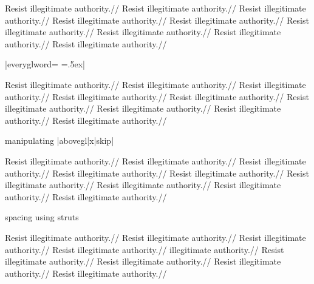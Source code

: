 \leavevmode
\begingl[glstyle=wrap,everygla=\ninerm,everyglb=\tenrm,
   everyglc=\elevenrm,everygld=\twelverm,everygle=\twelvebf,everyglf=\ninerm,
   everyglword=\offinterlineskip]
\gla Resist illegitimate authority.//
\glb Resist illegitimate authority.//
\glc Resist illegitimate authority.//
\gld Resist illegitimate authority.//
\gle Resist illegitimate authority.//
\gld Resist illegitimate authority.//
\glc Resist illegitimate authority.//
\glb Resist illegitimate authority.//
\glf Resist illegitimate authority.//
\endgl
\xe

\ex |everyglword={\baselineskip=0pt
\lineskip=.5ex}|
\smallskip

\leavevmode
\begingl[glstyle=wrap,everygla=\ninerm,everyglb=\tenrm,
   everyglc=\elevenrm,everygld=\twelverm,everygle=\twelvebf,everyglf=\ninerm,
   everyglword={\baselineskip=0pt \lineskip=.5ex}]
\gla Resist illegitimate authority.//
\glb Resist illegitimate authority.//
\glc Resist illegitimate authority.//
\gld Resist illegitimate authority.//
\gle Resist illegitimate authority.//
\gld Resist illegitimate authority.//
\glc Resist illegitimate authority.//
\glb Resist illegitimate authority.//
\glf Resist illegitimate authority.//
\endgl
\xe

\ex manipulating |abovegl|x|skip|
\smallskip

\leavevmode
\begingl[glstyle=wrap,everygla=\ninerm,everyglb=\tenrm,
   everyglc=\elevenrm,everygld=\twelverm,everygle=\twelvebf,everyglf=\ninerm,
   everyglword={\baselineskip=0pt \lineskip=.3ex}]
\gla Resist illegitimate authority.//
\glb Resist illegitimate authority.//
\glc Resist illegitimate authority.//
\gld Resist illegitimate authority.//
\gle[abovegleskip=2ex] Resist illegitimate authority.//
\gld[abovegldskip=2ex] Resist illegitimate authority.//
\glc Resist illegitimate authority.//
\glb Resist illegitimate authority.//
\glf Resist illegitimate authority.//
\endgl
\xe

\ex spacing using struts
\smallskip

\leavevmode
\begingl[glstyle=wrap,everygla=\ninerm,everyglb=\tenrm,
   everyglc=\elevenrm,everygld=\twelverm,everygle=\twelvebf,everyglf=\ninerm,
   everyglword={\baselineskip=0pt \lineskip=.3ex}]
\gla Resist illegitimate authority.//
\glb Resist illegitimate authority.//
\glc Resist illegitimate authority.//
\gld Resist illegitimate authority.//
 illegitimate authority.//
\gld Resist illegitimate authority.//
\glc Resist illegitimate authority.//
\glb Resist illegitimate authority.//
\glf Resist illegitimate authority.//
\endgl
\xe

